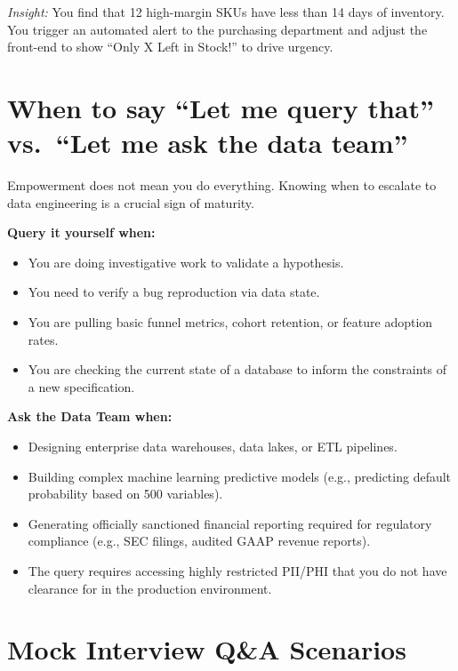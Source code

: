 \emph{Insight:} You find that 12 high-margin SKUs have less than 14 days
of inventory. You trigger an automated alert to the purchasing
department and adjust the front-end to show ``Only X Left in Stock!'' to
drive urgency.

\bigskip

\section{When to say ``Let me query that'' vs.~``Let me ask the data
team''}\label{when-to-say-let-me-query-that-vs.-let-me-ask-the-data-team}

Empowerment does not mean you do everything. Knowing when to escalate to
data engineering is a crucial sign of maturity.

\textbf{Query it yourself when:}

\begin{itemize}
\tightlist
\item
  You are doing investigative work to validate a hypothesis.
\item
  You need to verify a bug reproduction via data state.
\item
  You are pulling basic funnel metrics, cohort retention, or feature
  adoption rates.
\item
  You are checking the current state of a database to inform the
  constraints of a new specification.
\end{itemize}

\textbf{Ask the Data Team when:}

\begin{itemize}
\tightlist
\item
  Designing enterprise data warehouses, data lakes, or ETL pipelines.
\item
  Building complex machine learning predictive models (e.g., predicting
  default probability based on 500 variables).
\item
  Generating officially sanctioned financial reporting required for
  regulatory compliance (e.g., SEC filings, audited GAAP revenue
  reports).
\item
  The query requires accessing highly restricted PII/PHI that you do not
  have clearance for in the production environment.
\end{itemize}

\bigskip

\section{Mock Interview Q\&A
Scenarios}\label{mock-interview-qa-scenarios}

